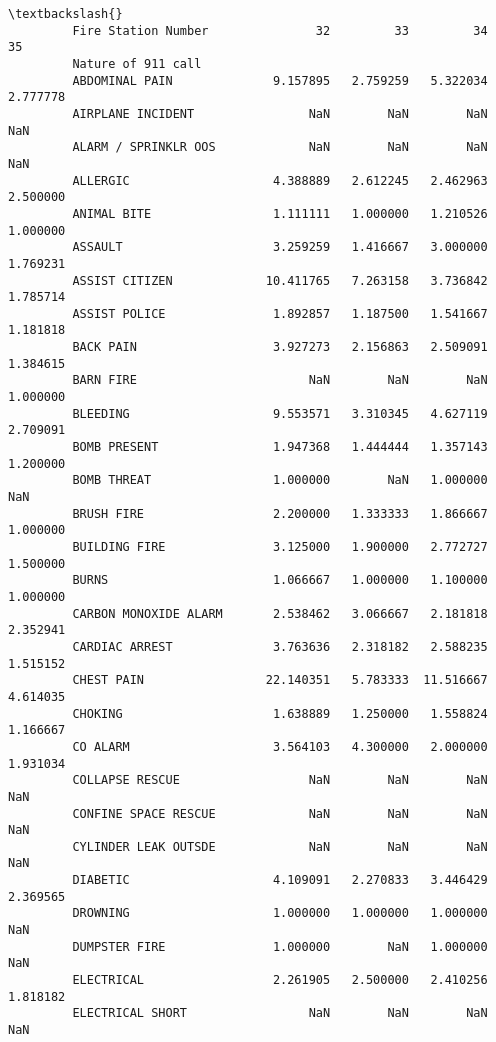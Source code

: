 \documentclass[11pt]{article}
\begin{document}
\begin{Verbatim}[commandchars=\\\{\}]
                                                                                \textbackslash{}
         Fire Station Number               32         33         34         35   
         Nature of 911 call                                                      
         ABDOMINAL PAIN              9.157895   2.759259   5.322034   2.777778   
         AIRPLANE INCIDENT                NaN        NaN        NaN        NaN   
         ALARM / SPRINKLR OOS             NaN        NaN        NaN        NaN   
         ALLERGIC                    4.388889   2.612245   2.462963   2.500000   
         ANIMAL BITE                 1.111111   1.000000   1.210526   1.000000   
         ASSAULT                     3.259259   1.416667   3.000000   1.769231   
         ASSIST CITIZEN             10.411765   7.263158   3.736842   1.785714   
         ASSIST POLICE               1.892857   1.187500   1.541667   1.181818   
         BACK PAIN                   3.927273   2.156863   2.509091   1.384615   
         BARN FIRE                        NaN        NaN        NaN   1.000000   
         BLEEDING                    9.553571   3.310345   4.627119   2.709091   
         BOMB PRESENT                1.947368   1.444444   1.357143   1.200000   
         BOMB THREAT                 1.000000        NaN   1.000000        NaN   
         BRUSH FIRE                  2.200000   1.333333   1.866667   1.000000   
         BUILDING FIRE               3.125000   1.900000   2.772727   1.500000   
         BURNS                       1.066667   1.000000   1.100000   1.000000   
         CARBON MONOXIDE ALARM       2.538462   3.066667   2.181818   2.352941   
         CARDIAC ARREST              3.763636   2.318182   2.588235   1.515152   
         CHEST PAIN                 22.140351   5.783333  11.516667   4.614035   
         CHOKING                     1.638889   1.250000   1.558824   1.166667   
         CO ALARM                    3.564103   4.300000   2.000000   1.931034   
         COLLAPSE RESCUE                  NaN        NaN        NaN        NaN   
         CONFINE SPACE RESCUE             NaN        NaN        NaN        NaN   
         CYLINDER LEAK OUTSDE             NaN        NaN        NaN        NaN   
         DIABETIC                    4.109091   2.270833   3.446429   2.369565   
         DROWNING                    1.000000   1.000000   1.000000        NaN   
         DUMPSTER FIRE               1.000000        NaN   1.000000        NaN   
         ELECTRICAL                  2.261905   2.500000   2.410256   1.818182   
         ELECTRICAL SHORT                 NaN        NaN        NaN        NaN   

\end{Verbatim}
\end{document}
